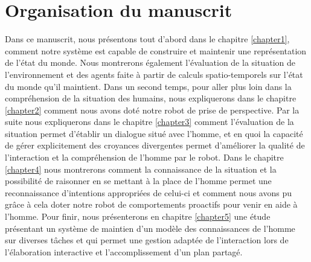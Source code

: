 \documentclass[a4paper,11pt,twoside]{StyleThese}
\begin{document}
\section{Organisation du manuscrit}
Dans ce manuscrit, nous présentons tout d'abord dans le chapitre \ref{chapter1}, comment notre système est capable  de construire et maintenir une représentation de l'état du monde. Nous montrerons également l'évaluation de la situation de l'environnement et des agents faite à partir de calculs spatio-temporels sur l'état du monde qu'il maintient.
Dans un second temps, pour aller plus loin dans la compréhension de la situation des humains, nous expliquerons dans le chapitre \ref{chapter2} comment nous avons doté notre robot de prise de perspective.
Par la suite nous expliquerons dans le chapitre \ref{chapter3} comment l'évaluation de la situation permet d'établir un dialogue situé avec l'homme, et en quoi la capacité de gérer explicitement des croyances divergentes permet d'améliorer la qualité de l'interaction et la compréhension de l'homme par le robot.
Dans le chapitre \ref{chapter4} nous montrerons comment la connaissance de la situation et la possibilité de raisonner en se mettant à la place de l'homme permet une reconnaissance d'intentions appropriées de celui-ci et comment nous avons pu grâce à cela doter notre robot de comportements proactifs pour venir en aide à l'homme.
Pour finir, nous présenterons en chapitre \ref{chapter5} une étude présentant un système de maintien d'un modèle des connaissances de l'homme sur diverses tâches et qui permet une gestion adaptée de l'interaction lors de l'élaboration interactive et l'accomplissement d'un plan partagé.

\ifdefined{}
\else


\end{document}
